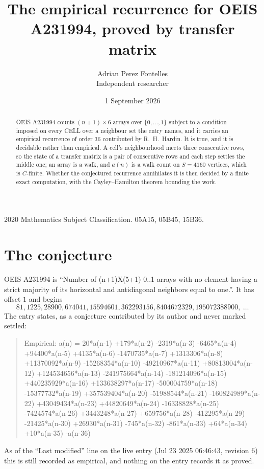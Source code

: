 \documentclass[11pt,a4paper]{article}
\title{The empirical recurrence for OEIS A231994, proved by transfer matrix}
\author{Adrian Perez Fontelles\\ \small Independent researcher}
\date{1 September 2026}
\theoremstyle{plain}
\theoremstyle{definition}
\begin{document}
\maketitle

\begin{abstract}
OEIS A231994 counts $(n+1)\times6$ arrays over $\{0,\dots,1\}$ subject to a condition imposed on
every CELL over a neighbour set the entry names, and it carries an empirical recurrence of
order $36$ contributed by R.~H.~Hardin. It is true, and it is decidable rather than
empirical. A cell's neighbourhood meets three consecutive rows, so the state of a transfer
matrix is a pair of consecutive rows and each step settles the middle one; an array is a
walk, and $a(n)$ is a walk count on $S=4160$ vertices, which is $C$-finite. Whether the
conjectured recurrence annihilates it is then decided by a finite exact computation, with the
Cayley--Hamilton theorem bounding the work.
\end{abstract}

\noindent\small 2020 Mathematics Subject Classification. 05A15, 05B45, 15B36.\normalsize

\section{The conjecture}

OEIS A231994 is ``Number of (n+1)X(5+1) 0..1 arrays with no element having a strict majority of its horizontal and antidiagonal neighbors equal to one.''. It has offset $1$ and begins
\[
81, 1225, 28900, 674041, 15594601, 362293156, 8404672329, 195072388900,\ \dots
\]
The entry states, as a conjecture contributed by its author and never marked settled:
\begin{quote}
Empirical: a(n) = 20*a(n-1) +179*a(n-2) -2319*a(n-3) -6465*a(n-4) +94400*a(n-5) +4135*a(n-6) -1470735*a(n-7) +1313306*a(n-8) +11370092*a(n-9) -15268354*a(n-10) -49210967*a(n-11) +80813004*a(n-12) +124534656*a(n-13) -241975664*a(n-14) -181214096*a(n-15) +440235929*a(n-16) +133638297*a(n-17) -500004759*a(n-18) -15377732*a(n-19) +357539404*a(n-20) -51988544*a(n-21) -160824989*a(n-22) +43049434*a(n-23) +44820649*a(n-24) -16338828*a(n-25) -7424574*a(n-26) +3443248*a(n-27) +659756*a(n-28) -412295*a(n-29) -21425*a(n-30) +26930*a(n-31) -745*a(n-32) -861*a(n-33) +64*a(n-34) +10*a(n-35) -a(n-36)
\end{quote}
As of the ``Last modified'' line on the live entry (Jul 23 2025 06:46:43, revision 6) this is still
recorded as empirical, and nothing on the entry records it as proved.
\end{document}
